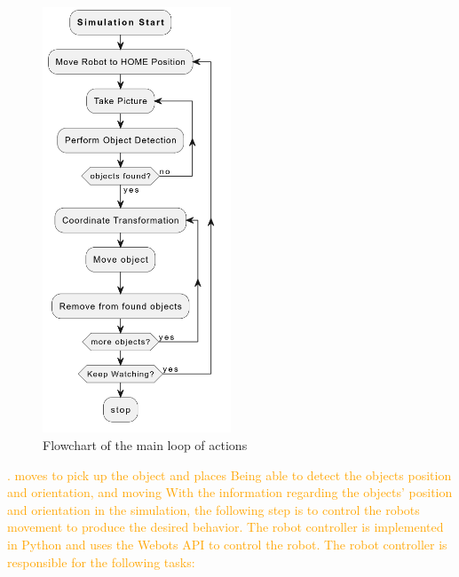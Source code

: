 

\begin{figure}[!h]
    \centering
    \includegraphics[width=0.5\textwidth]{Figures/sim_loop.png}
    \caption{Flowchart of the main loop of actions}
    \label{fig:flowchart}
\end{figure}

\textcolor{orange}{
. moves to pick up the object and places  
Being able to detect the objects position and orientation, and moving 
With the information regarding the objects' position and orientation in the simulation, the following step is to control the robots movement to produce the desired behavior. The robot controller is implemented in Python and uses the Webots API to control the robot. The robot controller is responsible for the following tasks:
}

